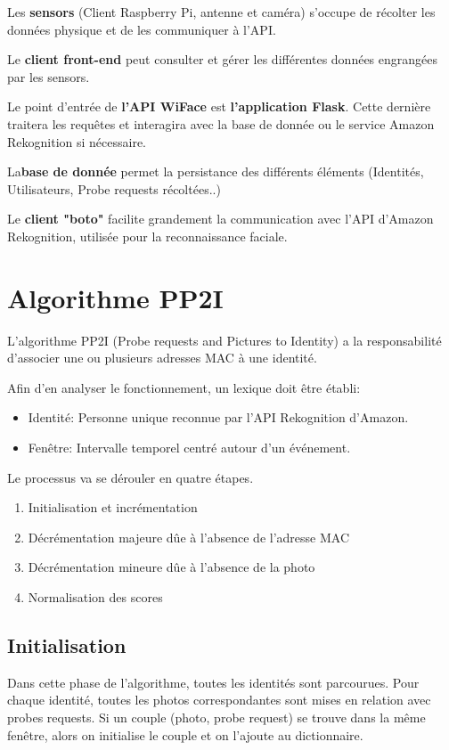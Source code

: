 Les \textbf{sensors} (Client Raspberry Pi, antenne et caméra) s'occupe de récolter les données physique et de les communiquer à l'API.

Le \textbf{client front-end} peut consulter et gérer les différentes données engrangées par les sensors.

Le point d'entrée de \textbf{l'API WiFace} est \textbf{l'application Flask}. Cette dernière traitera les requêtes
et interagira avec la base de donnée ou le service Amazon Rekognition si nécessaire.

La\textbf{base de donnée} permet la persistance des différents éléments (Identités, Utilisateurs, Probe requests récoltées..)

Le \textbf{client "boto"} facilite grandement la communication avec l'API d'Amazon Rekognition, utilisée pour la reconnaissance faciale.


\section{Algorithme PP2I}
L'algorithme PP2I (Probe requests and Pictures to Identity) a la responsabilité d'associer une ou plusieurs adresses MAC à une identité. 

Afin d'en analyser le fonctionnement, un lexique doit être établi:
\begin{itemize}
	\item Identité: Personne unique reconnue par l'API Rekognition d'Amazon.
	\item Fenêtre: Intervalle temporel centré autour d'un événement. 
\end{itemize}

Le processus va se dérouler en quatre étapes. 
\begin{enumerate}
	\item Initialisation et incrémentation
	\item Décrémentation majeure dûe à l'absence de l'adresse MAC
	\item Décrémentation mineure dûe à l'absence de la photo
	\item Normalisation des scores
\end{enumerate}

\subsection{Initialisation}
Dans cette phase de l'algorithme, toutes les identités sont parcourues.
Pour chaque identité, toutes les photos correspondantes sont mises en relation avec probes requests.
Si un couple (photo, probe request) se trouve dans la même fenêtre, alors on initialise le couple et on l'ajoute au dictionnaire.

